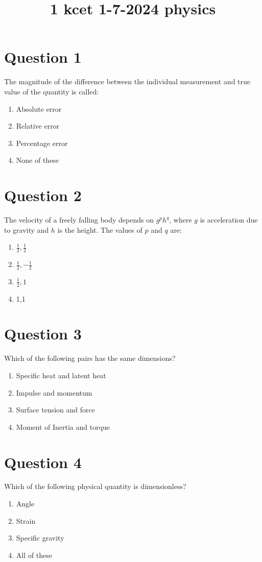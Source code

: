 \documentclass{article}
\title{1 kcet 1-7-2024 physics}
\begin{document}
                    \maketitle
                    \section*{Question 1}
The magnitude of the difference between the individual measurement and true value of the quantity is called:\newline
\begin{enumerate}[label=(\alph*)]
\item Absolute error
\item Relative error
\item Percentage error
\item None of these
\end{enumerate}
\newpage
\section*{Question 2}
The velocity of a freely falling body depends on \(g^{p} h^{q}\), where \(g\) is acceleration due to gravity and \(h\) is the height. The values of \(p\) and \(q\) are:
\begin{enumerate}[label=(\alph*)]
\item \(\frac{1}{2}, \frac{1}{2}\)
\item \(\frac{1}{2},-\frac{1}{2}\)
\item \(\frac{1}{2}, 1\)
\item 1,1
\end{enumerate}
\newpage
\section*{Question 3}
Which of the following pairs has the same dimensions?
\begin{enumerate}[label=(\alph*)]
\item Specific heat and latent heat
\item Impulse and momentum
\item Surface tension and force
\item Moment of Inertia and torque
\end{enumerate}
\newpage
\section*{Question 4}
Which of the following physical quantity is dimensionless?\newline
\begin{enumerate}[label=(\alph*)]
\item Angle
\item Strain
\item Specific gravity
\item All of these
\end{enumerate}
\newpage
\end{document}
